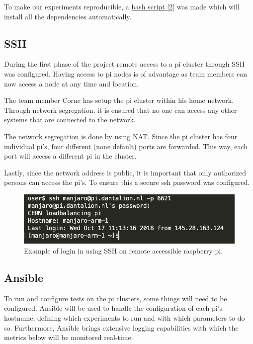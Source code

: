 \documentclass[]{article}
\begin{document}
To make our experiments reproducible, a \hyperref[sec:ref02]{bash script [2]} was made which will install all the dependencies automatically.

\subsection{SSH}
During the first phase of the project remote access to a pi cluster through \acrshort{SSH} was configured. Having access to pi nodes is of advantage as team members can now access a node at any time and location.

The team member Corne has setup the pi cluster within his home network. Through network segregation, it is ensured that no one can access any other systems that are connected to the network. 

The network segregation is done by using \acrfull{NAT}.
Since the pi cluster has four individual pi’s, four different (none default) ports are forwarded. This way, each port will access a different pi in the cluster.

Lastly, since the network address is public, it is important that only authorized persons can access the pi’s. To ensure this a secure ssh password was configured.

\begin{center}
	\begin{figure}[H]
		\includegraphics[width=\textwidth]{SSH}
		\caption{Example of login in using \acrshort{SSH} on remote accessible raspberry pi.}
		\label{fig:ssh}
	\end{figure}
\end{center}

\subsection{Ansible}
To run and configure tests on the pi clusters, some things will need to be configured. Ansible will be used to handle the configuration of each pi's hostname, defining which experiments to run and with which parameters to do so. Furthermore, Ansible brings extensive logging capabilities with which the metrics below will be monitored real-time.
\end{document}
